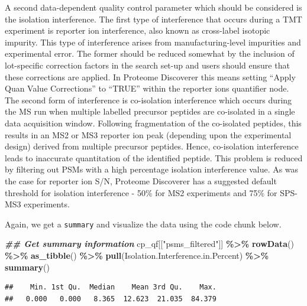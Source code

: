 \documentclass[9pt,a4paper,]{extarticle}
\newenvironment{Shaded}{\begin{snugshade}}{\end{snugshade}}
\newcommand{\DocumentationTok}[1]{\textcolor[rgb]{0.56,0.35,0.01}{\textbf{\textit{#1}}}}
\newcommand{\FunctionTok}[1]{\textcolor[rgb]{0.13,0.29,0.53}{\textbf{#1}}}
\newcommand{\NormalTok}[1]{#1}
\newcommand{\SpecialCharTok}[1]{\textcolor[rgb]{0.81,0.36,0.00}{\textbf{#1}}}
\newcommand{\StringTok}[1]{\textcolor[rgb]{0.31,0.60,0.02}{#1}}
\begin{document}
A second data-dependent quality control parameter which should be considered is
the isolation interference. The first type of interference that occurs during a
TMT experiment is reporter ion interference, also known as cross-label isotopic
impurity. This type of interference arises from manufacturing-level impurities
and experimental error. The former should be reduced somewhat by the inclusion
of lot-specific correction factors in the search set-up and users should ensure
that these corrections are applied. In Proteome Discoverer this means setting
``Apply Quan Value Corrections'' to ``TRUE'' within the reporter ions quantifier
node. The second form of interference is co-isolation interference which occurs
during the MS run when multiple labelled precursor peptides are co-isolated in a
single data acquisition window. Following fragmentation of the co-isolated
peptides, this results in an MS2 or MS3 reporter ion peak (depending upon the
experimental design) derived from multiple precursor peptides. Hence,
co-isolation interference leads to inaccurate quantitation of the identified
peptide. This problem is reduced by filtering out PSMs with a high percentage
isolation interference value. As was the case for reporter ion S/N, Proteome
Discoverer has a suggested default threshold for isolation interference - 50\%
for MS2 experiments and 75\% for SPS-MS3 experiments.

Again, we get a \texttt{summary} and visualize the data using the code chunk below.

\begin{Shaded}
\begin{Highlighting}[]
\DocumentationTok{\#\# Get summary information}
\NormalTok{cp\_qf[[}\StringTok{"psms\_filtered"}\NormalTok{]] }\SpecialCharTok{\%\textgreater{}\%} 
  \FunctionTok{rowData}\NormalTok{() }\SpecialCharTok{\%\textgreater{}\%} 
  \FunctionTok{as\_tibble}\NormalTok{() }\SpecialCharTok{\%\textgreater{}\%} 
  \FunctionTok{pull}\NormalTok{(Isolation.Interference.in.Percent) }\SpecialCharTok{\%\textgreater{}\%} 
  \FunctionTok{summary}\NormalTok{()}
\end{Highlighting}
\end{Shaded}

\begin{verbatim}
##    Min. 1st Qu.  Median    Mean 3rd Qu.    Max. 
##   0.000   0.000   8.365  12.623  21.035  84.379
\end{verbatim}
\end{document}
